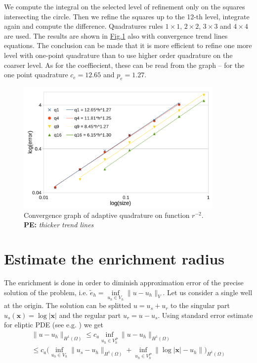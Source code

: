 \documentclass[preprint,12pt]{elsarticle}
\newcommand{\fig}[1]{\hyperref[#1]{Fig.\ref{#1}}}
\newcommand{\figpath}{../graphics/}
\def\vc#1{\mathbf{\boldsymbol{#1}}}     %
\def\norm#1{\| #1 \|}
\newcommand{\notePE}[1]{{\color{Orange} \textbf{PE: } \textit{#1}}}
\begin{document}
We compute the integral on the selected level of refinement only on the squares intersecting the circle. Then
we refine the squares up to the 12-th level, integrate again and compute the difference. Quadratures rules
$1\times1$, $2\times2$, $3\times3$ and $4\times4$ are used. The results are shown in 
\fig{fig:adapt_integration_conv} also with convergence trend lines equations. The conclusion can be made
that it is more efficient to refine one more level with one-point quadrature than to use higher order 
quadrature on the coarser level. As for the coeffiecient, these can be read from the graph -- for the one point
quadrature $c_e=12.65$ and $p_e=1.27$.

\begin{figure}[!htb]
  \centering    
  \includegraphics[width=0.9\textwidth]{results/adapt_integration_conv.pdf}
  \caption[Adaptive quadrature convergence.]{Convergence graph of adaptive quadrature on function $r^{-2}$.
  \\ \notePE{thicker trend lines}}
  \label{fig:adapt_integration_conv}
\end{figure}

\section{Estimate the enrichment radius}
The enrichment is done in order to diminish approximation error of the precise solution of the problem, i.e.
$\tilde e_h = \inf\limits_{u_h \in V_h} \| u - u_h \|_{V}$. Let us consider a single well at the origin. The solution
can be splitted $u=u_s+u_r$ to the singular part $u_s(\vc x)= \log |\vc x|$ and the regular part $u_r=u-u_s$.
Using standard error estimate for eliptic PDE (see e.g. \cite{arnold_lecture_2009}) we get
\begin{multline}
   \norm{u - u_h}_{H^1(\Omega)} \le c_a \inf_{u_h \in V^P_h} \norm{u - u_h}_{H^1(\Omega)} \\
   \le c_a \big(\inf_{u_h \in V_h} \norm{u_s - u_{h}}_{H^1(\Omega)} + \inf_{u_h \in V^P_h} \norm{\log |\vc x| - u_h}\big)_{H^1(\Omega)}
\end{multline}
\end{document}
